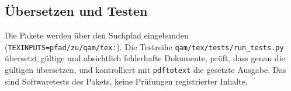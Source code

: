 \subsection{Übersetzen und Testen}

Die Pakete werden über den Suchpfad eingebunden (\texttt{TEXINPUTS=pfad/zu/qam/tex:}). Die Testreihe \texttt{qam/tex/tests/run\_tests.py}
übersetzt gültige und absichtlich fehlerhafte Dokumente, prüft, dass genau die gültigen übersetzen, und kontrolliert mit \texttt{pdftotext}
die gesetzte Ausgabe. Das sind Softwaretests des Pakets, keine Prüfungen registrierter Inhalte.
